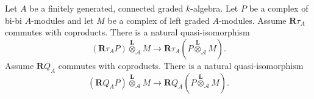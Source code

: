 \begin{proposition} \label{proposition: projection formula}
  Let \(A\) be a finitely generated, connected graded \(k\)-algebra.
  Let \(P\) be a complex of bi-bi \(A\)-modules and let \(M\) be a complex of left graded \(A\)-modules. Assume \(\mathbf{R} \tau_A\) commutes with coproducts. There is a natural quasi-isomorphism
  \begin{displaymath}
    ( \mathbf{R} \tau_A P ) \overset{\mathbf{L}}{\otimes}_{\mathcal A} M \to \mathbf{R} \tau_A \left( P \overset{\mathbf{L}}{\otimes}_{\mathcal A} M \right).
  \end{displaymath}
  Assume \(\mathbf{R} Q_A\) commutes with coproducts. There is a natural quasi-isomorphism
  \begin{displaymath}
    ( \mathbf{R} Q_A P ) \overset{\mathbf{L}}{\otimes}_{\mathcal A} M \to \mathbf{R} Q_A \left( P \overset{\mathbf{L}}{\otimes}_{\mathcal A} M \right).
  \end{displaymath}
\end{proposition}

